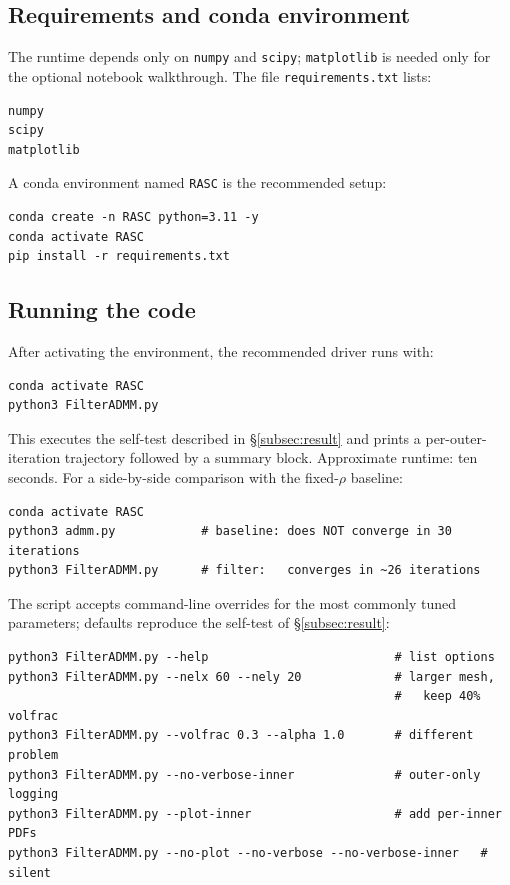 \documentclass[11pt]{article}
\begin{document}
\subsection{Requirements and conda environment}

The runtime depends only on \texttt{numpy} and \texttt{scipy}; \texttt{matplotlib} is needed only for the optional notebook walkthrough. The file \texttt{requirements.txt} lists:

\begin{verbatim}
numpy
scipy
matplotlib
\end{verbatim}

A conda environment named \texttt{RASC} is the recommended setup:

\begin{verbatim}
conda create -n RASC python=3.11 -y
conda activate RASC
pip install -r requirements.txt
\end{verbatim}

\subsection{Running the code}

After activating the environment, the recommended driver runs with:

\begin{verbatim}
conda activate RASC
python3 FilterADMM.py
\end{verbatim}

This executes the self-test described in \S\ref{subsec:result} and prints a per-outer-iteration trajectory followed by a summary block. Approximate runtime: ten seconds. For a side-by-side comparison with the fixed-$\rho$ baseline:

\begin{verbatim}
conda activate RASC
python3 admm.py            # baseline: does NOT converge in 30 iterations
python3 FilterADMM.py      # filter:   converges in ~26 iterations
\end{verbatim}

The script accepts command-line overrides for the most commonly tuned
parameters; defaults reproduce the self-test of \S\ref{subsec:result}:

\begin{verbatim}
python3 FilterADMM.py --help                          # list options
python3 FilterADMM.py --nelx 60 --nely 20             # larger mesh,
                                                      #   keep 40% volfrac
python3 FilterADMM.py --volfrac 0.3 --alpha 1.0       # different problem
python3 FilterADMM.py --no-verbose-inner              # outer-only logging
python3 FilterADMM.py --plot-inner                    # add per-inner PDFs
python3 FilterADMM.py --no-plot --no-verbose --no-verbose-inner   # silent
\end{verbatim}
\end{document}
